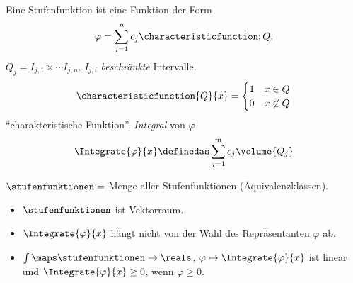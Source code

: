 \begin{definition}\label{stufen_mit_integral}
  Eine Stufenfunktion ist eine Funktion der Form
  \begin{equation*}
    \varphi=\sum_{j=1}^{n}c_j \characteristicfunction;{Q},
  \end{equation*}
  \( Q_j=I_{j,1}\times\dotsb I_{j,n} \), \( I_{j,i} \) \emph{beschränkte} Intervalle.
  \begin{equation*}
    \characteristicfunction{Q}{x}=\begin{cases}
      1&x\in Q\\
      0& x\not\in Q
    \end{cases}
  \end{equation*}
  \enquote{charakteristische Funktion}. \emph{Integral} von \( \varphi \)
  \begin{equation*}
    \Integrate{\varphi}{x}\definedas \sum_{j=1}^{m}c_j \volume{Q_j}
  \end{equation*}
\end{definition}
\begin{lemma}
  \( \stufenfunktionen= \) Menge aller Stufenfunktionen (\bzw Äquivalenzklassen).
  \begin{itemize}
    \item \( \stufenfunktionen \) ist Vektorraum.
    \item \label{integral_aequivalente_stufenfunktionen_gleich}\( \Integrate{\varphi}{x} \) hängt nicht von der Wahl des Repräsentanten \( \varphi \) ab.
    \item \( \int\maps \stufenfunktionen \to \reals \), \( \varphi\mapsto \Integrate{\varphi}{x} \) ist linear und \( \Integrate{\varphi}{x}\geq 0 \), wenn \( \varphi\geq 0 \).
  \end{itemize}
\end{lemma}
